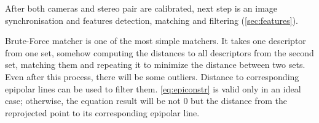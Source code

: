 After both cameras and stereo pair are calibrated, next step is an image synchronisation and features detection, matching and filtering (\autoref{sec:features}). 

Brute-Force matcher is one of the most simple matchers.
It takes one descriptor from one set, somehow computing the distances to all descriptors from the second set, matching them and repeating it to minimize the distance between two sets.
Even after this process, there will be some outliers.
Distance to corresponding epipolar lines can be used to filter them. \autoref{eq:epiconstr} is valid only in an ideal case; otherwise, the equation result will be not $0$ but the distance from the reprojected point to its corresponding epipolar line.



